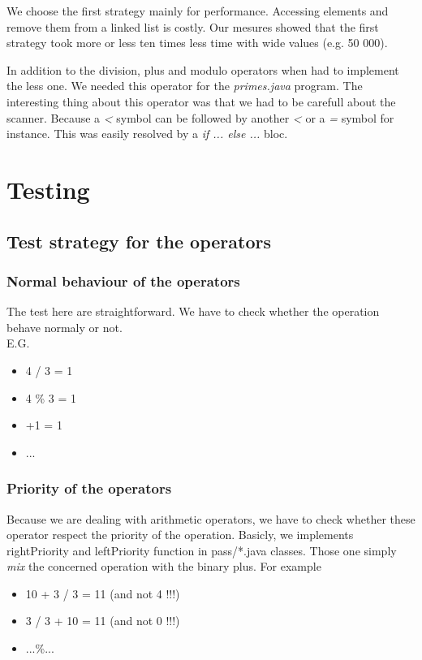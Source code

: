 \documentclass[10pt,a4paper]{article}
\begin{document}
We choose the first strategy mainly for performance. Accessing elements and remove them from a linked list is costly. Our mesures showed that the first strategy took more or less ten times less time with wide values (e.g. 50 000).

In addition to the division, plus and modulo operators when had to implement the less one. We needed this operator for the \emph{primes.java} program. The interesting thing about this operator was that we had to be carefull about the scanner. Because a \emph{<} symbol can be followed by another \emph{<} or a \emph{=} symbol for instance. This was easily resolved by a \emph{if ... else ...} bloc.

\section{Testing}
\subsection{Test strategy for the operators}
\subsubsection{Normal behaviour of the operators}
	The test here are straightforward. We have to check whether the operation behave normaly or not. \\
	E.G.
	\begin{itemize}
		\item{4 / 3 = 1}
		\item{4 \% 3 = 1}
		\item{+1 = 1}
		\item{...}
	\end{itemize}
\subsubsection{Priority of the operators}
	Because we are dealing with arithmetic operators, we have to check whether these operator respect the priority of the operation. Basicly, we implements rightPriority and leftPriority function in pass/*.java classes. Those one simply \textit{mix} the concerned operation with the binary plus.
	For example
	\begin{itemize}
		\item{10 + 3 / 3 = 11 (and not 4 !!!)}
		\item{3 / 3 + 10 = 11 (and not 0 !!!)}
		\item{...\%...}
	\end{itemize}		
\end{document}
